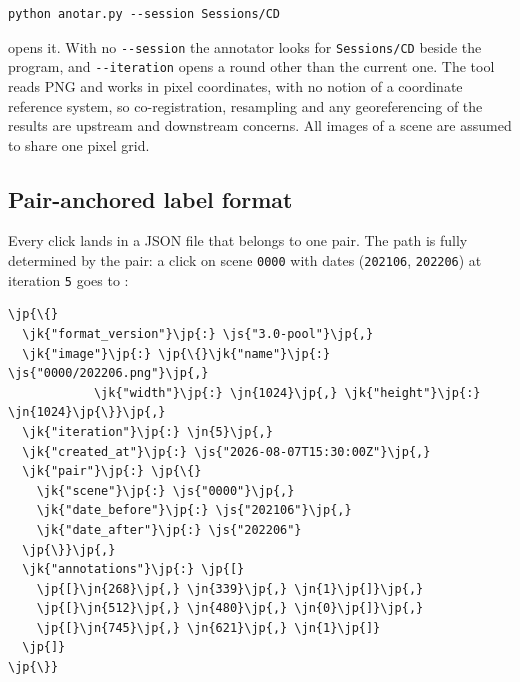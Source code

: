 \begin{verbatim}
python anotar.py --session Sessions/CD
\end{verbatim}

\noindent
opens it. With no \texttt{-{}-session} the annotator looks for
\texttt{Sessions/CD} beside the program, and \texttt{-{}-iteration}
opens a round other than the current one. The tool reads PNG and
works in pixel
coordinates, with no notion of a coordinate reference system, so
co-registration, resampling and any georeferencing of the results
are upstream and downstream concerns. All images of a scene are
assumed to share one pixel grid.

\subsection{Pair-anchored label format}
\label{sec:label_format}

Every click lands in a JSON file that belongs to one pair. The path
is fully determined by the pair: a click on scene \texttt{0000}
with dates (\texttt{202106}, \texttt{202206}) at iteration
\texttt{5} goes to
:

\begin{tcolorbox}[enhanced, colback=treebg, frame hidden, boxrule=0pt,
    borderline west={2pt}{0pt}{jsonkey}, arc=1.5pt,
    left=10pt, right=8pt, top=8pt, bottom=8pt]
\begin{Verbatim}[commandchars=\\\{\},fontsize=\footnotesize]
\jp{\{}
  \jk{"format_version"}\jp{:} \js{"3.0-pool"}\jp{,}
  \jk{"image"}\jp{:} \jp{\{}\jk{"name"}\jp{:} \js{"0000/202206.png"}\jp{,}
            \jk{"width"}\jp{:} \jn{1024}\jp{,} \jk{"height"}\jp{:} \jn{1024}\jp{\}}\jp{,}
  \jk{"iteration"}\jp{:} \jn{5}\jp{,}
  \jk{"created_at"}\jp{:} \js{"2026-08-07T15:30:00Z"}\jp{,}
  \jk{"pair"}\jp{:} \jp{\{}
    \jk{"scene"}\jp{:} \js{"0000"}\jp{,}
    \jk{"date_before"}\jp{:} \js{"202106"}\jp{,}
    \jk{"date_after"}\jp{:} \js{"202206"}
  \jp{\}}\jp{,}
  \jk{"annotations"}\jp{:} \jp{[}
    \jp{[}\jn{268}\jp{,} \jn{339}\jp{,} \jn{1}\jp{]}\jp{,}
    \jp{[}\jn{512}\jp{,} \jn{480}\jp{,} \jn{0}\jp{]}\jp{,}
    \jp{[}\jn{745}\jp{,} \jn{621}\jp{,} \jn{1}\jp{]}
  \jp{]}
\jp{\}}
\end{Verbatim}
\end{tcolorbox}

